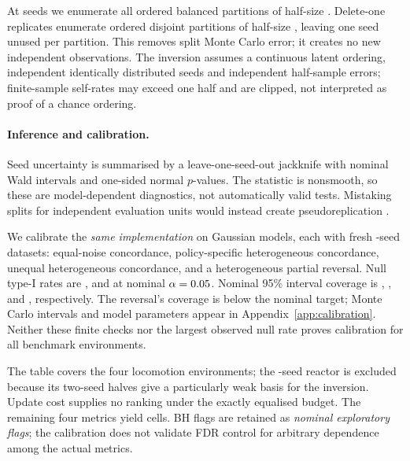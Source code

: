 \documentclass{article}
\begin{document}
At \SeedsHopper{} seeds we enumerate all \FullSplitCount{} ordered balanced
partitions of half-size \MetricHalfSize{}. Delete-one replicates enumerate
\JackSplitCount{} ordered disjoint partitions of half-size \JackHalfSize{},
leaving one seed unused per partition. This removes split Monte Carlo error;
it creates no new independent observations. The inversion assumes a
continuous latent ordering, independent identically distributed seeds and
independent half-sample errors; finite-sample self-rates may exceed one half
and are clipped, not interpreted as proof of a chance ordering.

\paragraph{Inference and calibration.}
Seed uncertainty is summarised by a leave-one-seed-out jackknife with
nominal Wald intervals and one-sided normal $p$-values. The statistic is
nonsmooth, so these are model-dependent diagnostics, not automatically valid
tests. Mistaking splits for independent evaluation units would instead
create pseudoreplication \citep{hurlbert1984pseudoreplication}.

We calibrate the \emph{same implementation} on \CalibrationCases{} Gaussian
models, each with \CalibrationDatasets{} fresh \CalibrationSeeds{}-seed
datasets: equal-noise concordance, policy-specific heterogeneous concordance,
unequal heterogeneous concordance, and a heterogeneous partial reversal.
Null type-I rates are \CalibrationRejectionEqual{},
\CalibrationRejectionHetero{} and \CalibrationRejectionUnequal{} at nominal
$\alpha=0.05{}$. Nominal 95\% interval coverage is
\CalibrationCoverageEqual{}, \CalibrationCoverageHetero{},
\CalibrationCoverageUnequal{} and \CalibrationCoverageReversal{},
respectively. The reversal's \CalibrationCoverageReversal{} coverage is
below the nominal target; Monte Carlo intervals and model parameters appear
in Appendix~\ref{app:calibration}. Neither these finite checks nor the largest
observed null rate proves calibration for all benchmark environments.

The table covers the four locomotion environments; the
\SeedsPcgym{}-seed reactor is excluded because its two-seed halves give a
particularly weak basis for the inversion. Update cost supplies no ranking
under the exactly equalised budget. The remaining four metrics yield
\NTests{} cells. BH flags are retained as \emph{nominal exploratory flags};
the calibration does not validate FDR control for arbitrary dependence
among the actual metrics.
\end{document}
